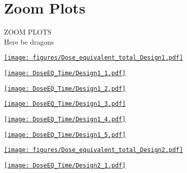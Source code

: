 \documentclass[xcolor={dvipsnames}]{beamer}
\begin{document}
\section{Zoom Plots}
\begin{frame}
  \begin{center}
    \huge
    ZOOM PLOTS\\
    \tiny
    Here be dragons
  \end{center}
\end{frame}
\begin{frame}[plain]
 \hypertarget{Dose_equivalent_Design1}{\hyperlink{coolingtimesprev_Design1}{\texttt{[image: figures/Dose\_equivalent\_total\_Design1.pdf]}}}
\end{frame}
\begin{frame}[plain]
 \hypertarget{Dose_equivalent_minute_Design1}{\hyperlink{coolingtimesprev_Design1}{\texttt{[image: DoseEQ\_Time/Design1\_1.pdf]}}}
\end{frame}
\begin{frame}[plain]
 \hypertarget{Dose_equivalent_hour_Design1}{\hyperlink{coolingtimesprev_Design1}{\texttt{[image: DoseEQ\_Time/Design1\_2.pdf]}}}
\end{frame}
\begin{frame}[plain]
 \hypertarget{Dose_equivalent_day_Design1}{\hyperlink{coolingtimesprev_Design1}{\texttt{[image: DoseEQ\_Time/Design1\_3.pdf]}}}
\end{frame}
\begin{frame}[plain]
 \hypertarget{Dose_equivalent_month_Design1}{\hyperlink{coolingtimesprev_Design1}{\texttt{[image: DoseEQ\_Time/Design1\_4.pdf]}}}
\end{frame}
\begin{frame}[plain]
 \hypertarget{Dose_equivalent_year_Design1}{\hyperlink{coolingtimesprev_Design1}{\texttt{[image: DoseEQ\_Time/Design1\_5.pdf]}}}
\end{frame}
\begin{frame}[plain]
 \hypertarget{Dose_equivalent_Design2}{\hyperlink{coolingtimesprev_Design2}{\texttt{[image: figures/Dose\_equivalent\_total\_Design2.pdf]}}}
\end{frame}
\begin{frame}[plain]
 \hypertarget{Dose_equivalent_minute_Design2}{\hyperlink{coolingtimesprev_Design2}{\texttt{[image: DoseEQ\_Time/Design2\_1.pdf]}}}
\end{frame}
\end{document}
